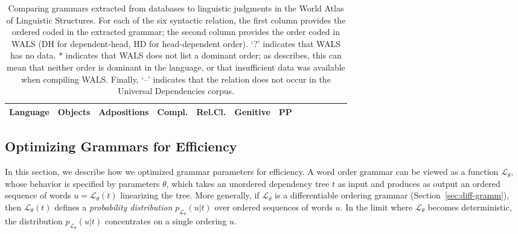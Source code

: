 \documentclass[10pt,twoside,lineno]{article}
\begin{document}
\begin{table}
\small{
\begin{center}
\begin{tabular}{l||ll|ll|ll|ll|ll|ll|llllll}
		   Language 
		   &	\multicolumn{2}{c|}{Objects} 
		   &	\multicolumn{2}{c|}{Adpositions} 
		   &	\multicolumn{2}{c|}{Compl.} 
		   &	\multicolumn{2}{c|}{Rel.Cl.} 
		   &	\multicolumn{2}{c|}{Genitive} 
		   &	\multicolumn{2}{c|}{PP}  \\ \hline\hline
	
\end{tabular}
\end{center}
}
\caption{Comparing grammars extracted from databases to linguistic judgments in the World Atlas of Linguistic Structures. For each of the six syntactic relation, the first column provides the ordered coded in the extracted grammar; the second column provides the order coded in WALS (DH for dependent-head, HD for head-dependent order). `?' indicates that WALS has no data.
$*$ indicates that WALS does not list a dominant order; as \citet{dryer2011evidence} describes, this can mean that neither order is dominant in the language, or that insufficient data was available when compiling WALS.
Finally, `--' indicates that the relation does not occur in the Universal Dependencies corpus.
}\label{tab:grammars-wals}
\end{table}




\subsection{Optimizing Grammars for Efficiency}\label{sec:optim-eff}

In this section, we describe how we optimized grammar parameters for efficiency.
A word order grammar can be viewed as a function $\mathcal{L}_\theta$, whose behavior is specified by parameters $\theta$, which takes an unordered dependency tree $t$ as input and produces as output an ordered sequence of words $u = \mathcal{L}_\theta(t)$ linearizing the tree.
More generally, if $\mathcal{L}_\theta$ is a differentiable ordering grammar (Section~\ref{sec:diff-gramm}), then $\mathcal{L}_\theta(t)$ defines a \emph{probability distribution} $p_{\mathcal{L}_\theta}(u|t)$ over ordered sequences of words $u$.
In the limit where $\mathcal{L}_\theta$ becomes deterministic, the distribution $p_{\mathcal{L}_\theta}(u|t)$ concentrates on a single ordering $u$.
\end{document}
